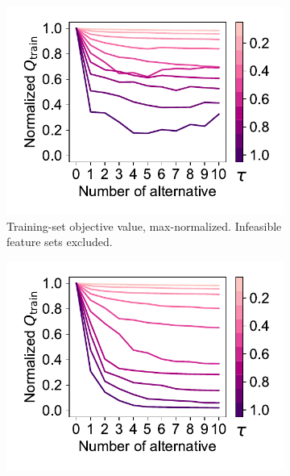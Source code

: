 \documentclass{article}
\theoremstyle{definition}
\begin{document}
\begin{figure}[p]
	\centering
	\begin{subfigure}[t]{0.48\textwidth}
		\centering
		\includegraphics[width=\textwidth, trim=15 15 10 15, clip]{plots/afs-impact-num-alternatives-tau-train-objective-max.pdf}
		\caption{
			Training-set objective value, max-normalized.
			Infeasible feature sets excluded.
		}
		\label{fig:afs:impact-num-alternatives-tau-train-objective-max}
	\end{subfigure}
	\hfill
	\begin{subfigure}[t]{0.48\textwidth}
		\centering
		\includegraphics[width=\textwidth, trim=15 15 10 15, clip]{plots/afs-impact-num-alternatives-tau-train-objective-max-fillna.pdf}

\end{subfigure}
\end{figure}
\end{document}

